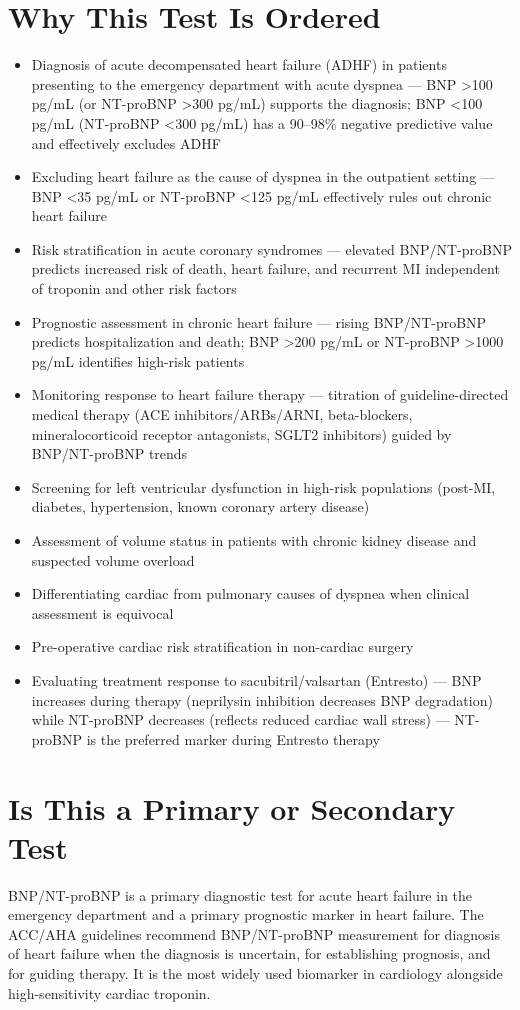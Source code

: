 \section*{Why This Test Is Ordered}
\begin{itemize}
  \item Diagnosis of acute decompensated heart failure (ADHF) in patients presenting to the emergency department with acute dyspnea --- BNP >100 pg/mL (or NT-proBNP >300 pg/mL) supports the diagnosis; BNP <100 pg/mL (NT-proBNP <300 pg/mL) has a 90--98\% negative predictive value and effectively excludes ADHF
  \item Excluding heart failure as the cause of dyspnea in the outpatient setting --- BNP <35 pg/mL or NT-proBNP <125 pg/mL effectively rules out chronic heart failure
  \item Risk stratification in acute coronary syndromes --- elevated BNP/NT-proBNP predicts increased risk of death, heart failure, and recurrent MI independent of troponin and other risk factors
  \item Prognostic assessment in chronic heart failure --- rising BNP/NT-proBNP predicts hospitalization and death; BNP >200 pg/mL or NT-proBNP >1000 pg/mL identifies high-risk patients
  \item Monitoring response to heart failure therapy --- titration of guideline-directed medical therapy (ACE inhibitors/ARBs/ARNI, beta-blockers, mineralocorticoid receptor antagonists, SGLT2 inhibitors) guided by BNP/NT-proBNP trends
  \item Screening for left ventricular dysfunction in high-risk populations (post-MI, diabetes, hypertension, known coronary artery disease)
  \item Assessment of volume status in patients with chronic kidney disease and suspected volume overload
  \item Differentiating cardiac from pulmonary causes of dyspnea when clinical assessment is equivocal
  \item Pre-operative cardiac risk stratification in non-cardiac surgery
  \item Evaluating treatment response to sacubitril/valsartan (Entresto) --- BNP increases during therapy (neprilysin inhibition decreases BNP degradation) while NT-proBNP decreases (reflects reduced cardiac wall stress) --- NT-proBNP is the preferred marker during Entresto therapy
\end{itemize}

\section*{Is This a Primary or Secondary Test}
BNP/NT-proBNP is a primary diagnostic test for acute heart failure in the emergency department and a primary prognostic marker in heart failure. The ACC/AHA guidelines recommend BNP/NT-proBNP measurement for diagnosis of heart failure when the diagnosis is uncertain, for establishing prognosis, and for guiding therapy. It is the most widely used biomarker in cardiology alongside high-sensitivity cardiac troponin.

